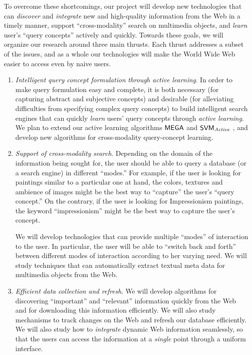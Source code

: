 To overcome these shortcomings, our project will develop new
technologies that can {\em discover} and {\em integrate} 
new and high-quality information from the Web in a timely manner,
support ``cross-modality'' search on multimedia objects, and
{\em learn} user's ``query concepts'' actively and quickly.
Towards these goals, we will organize our research around three main 
thrusts. Each thrust addresses a subset of the issues,
and as a whole our technologies will make the World Wide Web
easier to access even by naive users.

\begin{enumerate}
\item {\em Intelligent query concept formulation through active learning}.
 In order to make query formulation easy and complete, it is both
 necessary (for capturing abstract and subjective concepts) and
 desirable (for alleviating difficulties from specifying complex query
 concepts) to build intelligent search engines that can quickly {\em
 learn} users' query concepts through {\em active learning}.  We plan
 to extend our active learning algorithms $\mathsf{MEGA}$ 
 and $\mathsf{SVM}_{\mbox{\scriptsize{\textit{Active}}}}$ \cite{LCL01,SVM01},
 and develop new algorithms for
 cross-modality query-concept learning.

\item {\em Support of cross-modality search}. Depending on
  the domain of the information being sought for, the user
  should be able to query a database (or a search engine) 
  in different ``modes.''
  For example, if the user is looking for paintings similar
  to a particular one at hand, the colors, textures and ambience of images
  might be the best way to ``capture'' the user's ``query concept.''
  On the contrary, if the user is looking for Impressionism paintings,
  the keyword ``impressionism'' might be the best way to capture the user's
  concept. 

  We will develop technologies that can provide multiple ``modes''
  of interaction to the user. In particular, the user will
  be able to ``switch back and forth'' between different modes of
  interaction according to her varying need. 
  We will study techniques that can automatically extract
  textual meta data for multimedia objects from the Web.

\item {\em Efficient data collection and refresh}.
  We will develop algorithms for discovering ``important''
  and ``relevant'' information quickly from the Web
  and for downloading this information efficiently.
  We will also study mechanisms to track
  changes on the Web and refresh our database efficiently.
  We will also study how to {\em integrate} dynamic Web information
  seamlessly, so that the users can access the information 
  at a {\em single} point through a uniform interface.
\end{enumerate}

